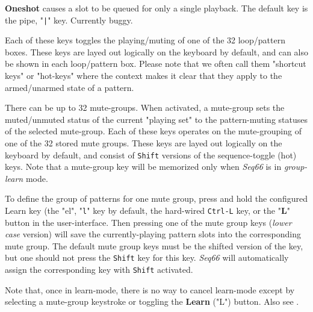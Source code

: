    \textbf{Oneshot}
   causes a slot to be queued for only a single playback.
   The default key is the pipe, "\texttt{|}" key.
   Currently buggy.

   Each of these keys toggles the playing/muting of one of the 32
   loop/pattern boxes.
   These keys are layed out logically on the keyboard by default,
   and can also be shown in each loop/pattern box.
   Please note that we often call them "shortcut keys" or "hot-keys"
   where the context
   makes it clear that they apply to the armed/unarmed state of a pattern.

   There can be up to 32 mute-groups.
   When activated, a mute-group
   sets the muted/unmuted status of the current "playing set"
   to the pattern-muting statuses of the selected mute-group.
   Each of these keys operates on the mute-grouping of one of the 32
   stored mute groups.
   These keys are layed out logically on the keyboard by default, and consist
   of \texttt{Shift} versions of the sequence-toggle (hot) keys.
   Note that a mute-group key will be memorized only when
   \textsl{Seq66} is in
   \textsl{group-learn} mode.


   To define the group of patterns for one mute group, press and hold the
   configured Learn key (the "el", "\texttt{l}" key by default,
   the hard-wired \texttt{Ctrl-L} key, or the "\textbf{L}"
   button in the user-interface.
   Then pressing one of the mute group keys (\textsl{lower case} version)
   will save the currently-playing pattern slots into the corresponding mute
   group.
   The default mute group keys must be the shifted version of the key,
   but one should not press the \texttt{Shift} key for this key.
   \textsl{Seq66} will automatically assign the corresponding key with
   \texttt{Shift} activated.

   Note that, once in learn-mode, there is no way to cancel learn-mode
   except by selecting a mute-group keystroke or toggling the
   \textbf{Learn} ("L") button.
   Also see .

